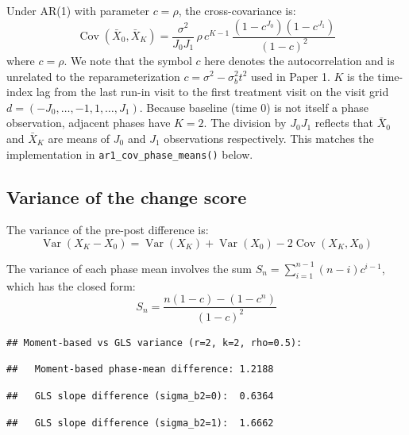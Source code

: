 \documentclass[
  11pt,
]{article}
\begin{document}
Under AR(1) with parameter \(c = \rho\), the
cross-covariance is:
\begin{equation}
  \mathop{\mathrm{Cov}}(\bar{X}_0, \bar{X}_K)
  = \frac{\sigma^2}{J_0 J_1}\,\rho\, c^{K-1}\,
    \frac{(1 - c^{J_0})(1 - c^{J_1})}{(1 - c)^2}
\end{equation}
where \(c = \rho\). We note that the symbol \(c\) here
denotes the autocorrelation and is unrelated to the
reparameterization \(c = \sigma^2 - \sigma_b^2 t^2\) used
in Paper 1. \(K\) is the time-index lag from the last
run-in visit to the first treatment visit on the visit
grid \(d = (-J_0, \ldots, -1, 1, \ldots, J_1)\). Because
baseline (time 0) is not itself a phase observation,
adjacent phases have \(K = 2\). The division by \(J_0 J_1\)
reflects that \(\bar{X}_0\) and \(\bar{X}_K\) are means of
\(J_0\) and \(J_1\) observations respectively. This matches
the implementation in \texttt{ar1\_cov\_phase\_means()} below.

\subsection{Variance of the change score}\label{variance-of-the-change-score}

The variance of the pre-post difference is:
\begin{equation}
  \mathop{\mathrm{Var}}(X_K - X_0) = \mathop{\mathrm{Var}}(X_K) + \mathop{\mathrm{Var}}(X_0)
    - 2\mathop{\mathrm{Cov}}(X_K, X_0)
\end{equation}

The variance of each phase mean involves the sum
\(S_n = \sum_{i=1}^{n-1}(n-i)c^{i-1}\), which has the
closed form:
\begin{equation}
  S_n = \frac{n(1-c) - (1-c^n)}{(1-c)^2}
\end{equation}

\begin{verbatim}
## Moment-based vs GLS variance (r=2, k=2, rho=0.5):
\end{verbatim}

\begin{verbatim}
##   Moment-based phase-mean difference: 1.2188
\end{verbatim}

\begin{verbatim}
##   GLS slope difference (sigma_b2=0):  0.6364
\end{verbatim}

\begin{verbatim}
##   GLS slope difference (sigma_b2=1):  1.6662
\end{verbatim}
\end{document}
